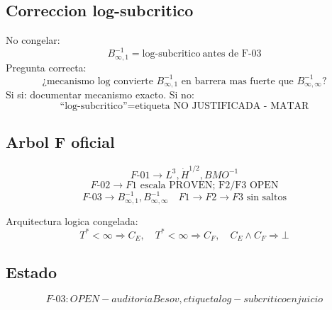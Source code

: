 \documentclass[11pt]{article}
\begin{document}
\subsection*{Correccion log-subcritico}
No congelar:
\[
\boxed{B^{-1}_{\infty,1}=\text{log-subcritico}}\ \text{antes de F-03}
\]
Pregunta correcta:
\[
\boxed{\text{¿mecanismo log convierte }B^{-1}_{\infty,1}\text{ en barrera mas fuerte que }B^{-1}_{\infty,\infty}?}
\]
Si si: documentar mecanismo exacto.
Si no:
\[
\boxed{\text{``log-subcritico''=etiqueta NO JUSTIFICADA - MATAR}}
\]

\subsection*{Arbol F oficial}
\[
F\text{-}01\to L^3,\dot H^{1/2},BMO^{-1}
\]
\[
F\text{-}02\to\boxed{F1\text{ escala PROVEN; F2/F3 OPEN}}
\]
\[
F\text{-}03\to B^{-1}_{\infty,1},B^{-1}_{\infty,\infty}\quad\boxed{F1\to F2\to F3\text{ sin saltos}}
\]

Arquitectura logica congelada:
\[
\boxed{T^*<\infty\Rightarrow C_E,\quad T^*<\infty\Rightarrow C_F,\quad C_E\land C_F\Rightarrow\bot}
\]

\subsection*{Estado}
\[
\boxed{F\text{-}03: OPEN - auditoria Besov, etiqueta log-subcritico en juicio}
\]
\end{document}
